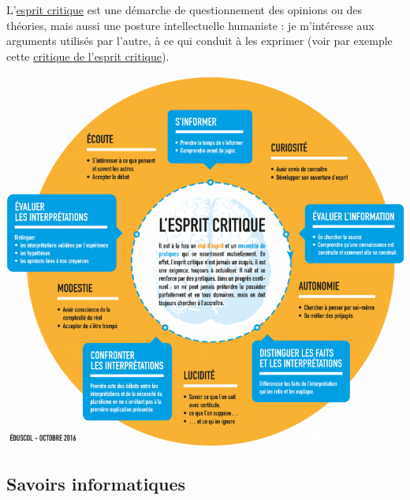 

L’\href{https://fr.wikipedia.org/wiki/Esprit_critique}{esprit critique} est une démarche de questionnement des opinions ou des théories, mais aussi une posture intellectuelle humaniste : je m’intéresse aux arguments utilisés par l'autre, à ce qui conduit à les exprimer (voir par exemple cette \href{https://pixees.fr/critique-de-lesprit-critique/}{critique de l'esprit critique}).


\begin{fullwidth}
\includegraphics[width=\linewidth]{./Images/Chapter00/critique-esprit-critique.png}
\end{fullwidth}


\subsection*{Savoirs informatiques}


